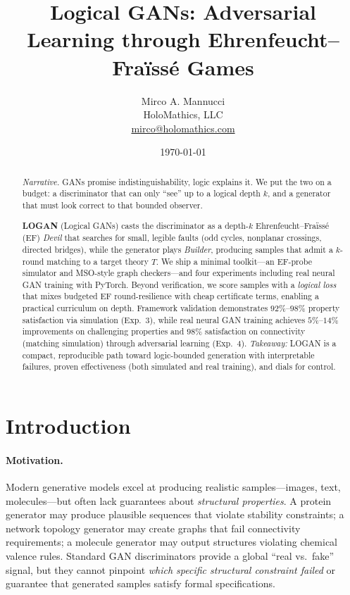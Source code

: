 \documentclass{article}
\title{Logical GANs: Adversarial Learning through Ehrenfeucht--Fra\"iss\'e Games}
\author{
  Mirco A. Mannucci \\
  HoloMathics, LLC \\
  \href{mailto:mirco@holomathics.com}{mirco@holomathics.com}
}
\date{\today}
\begin{document}
\maketitle

\begin{abstract}
\textit{Narrative.}
GANs promise indistinguishability, logic explains it. We put the two on a budget: a discriminator that can only ``see'' up to a logical depth $k$, and a generator that must look correct to that bounded observer.

\textbf{LOGAN} (Logical GANs) casts the discriminator as a depth-$k$ Ehrenfeucht--Fra\"iss\'e (EF) \emph{Devil} that searches for small, legible faults (odd cycles, nonplanar crossings, directed bridges), while the generator plays \emph{Builder}, producing samples that admit a $k$-round matching to a target theory $T$.
We ship a minimal toolkit---an EF-probe simulator and MSO-style graph checkers---and four experiments including real neural GAN training with PyTorch.
Beyond verification, we score samples with a \emph{logical loss} that mixes budgeted EF round-resilience with cheap certificate terms, enabling a practical curriculum on depth. Framework validation demonstrates $92\%$--$98\%$ property satisfaction via simulation (Exp.~3), while real neural GAN training achieves $5\%$--$14\%$ improvements on challenging properties and $98\%$ satisfaction on connectivity (matching simulation) through adversarial learning (Exp.~4).
\textit{Takeaway:} LOGAN is a compact, reproducible path toward logic-bounded generation with interpretable failures, proven effectiveness (both simulated and real training), and dials for control.
\end{abstract}

\section{Introduction}

\paragraph{Motivation.}
Modern generative models excel at producing realistic samples---images, text, molecules---but often lack guarantees about \emph{structural properties}. A protein generator may produce plausible sequences that violate stability constraints; a network topology generator may create graphs that fail connectivity requirements; a molecule generator may output structures violating chemical valence rules. Standard GAN discriminators provide a global ``real vs.\ fake'' signal, but they cannot pinpoint \emph{which specific structural constraint failed} or guarantee that generated samples satisfy formal specifications.
\end{document}
